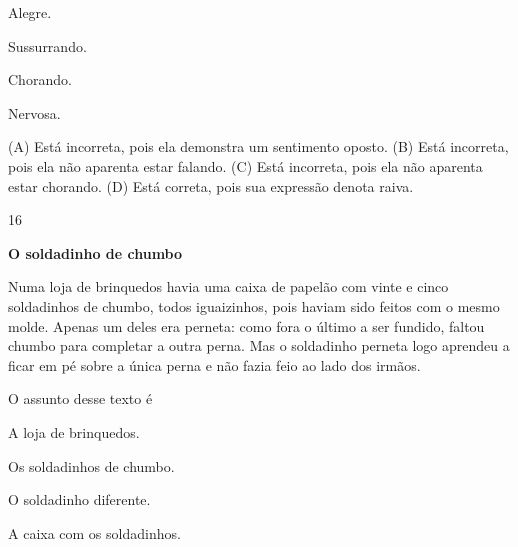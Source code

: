 \begin{minipage}{.5\textwidth}
\begin{escolha}
\item Alegre.

\item Sussurrando.

\item Chorando.

\item Nervosa.
\end{escolha}
\end{minipage}

(A) Está incorreta, pois ela demonstra um sentimento oposto.
(B) Está incorreta, pois ela não aparenta estar falando.
(C) Está incorreta, pois ela não aparenta estar chorando.
(D) Está correta, pois sua expressão denota raiva.

\num{16}

\textbf{O soldadinho de chumbo}

Numa loja de brinquedos havia uma caixa de papelão com
vinte e cinco soldadinhos de chumbo, todos iguaizinhos, pois
haviam sido feitos com o mesmo molde. Apenas um deles
era perneta: como fora o último a ser fundido, faltou chumbo
para completar a outra perna. Mas o soldadinho perneta logo
aprendeu a ficar em pé sobre a única perna e não fazia feio ao
lado dos irmãos.


O assunto desse texto é

\begin{escolha}
\item A loja de brinquedos.

\item Os soldadinhos de chumbo.

\item O soldadinho diferente.

\item A caixa com os soldadinhos.
\end{escolha}


